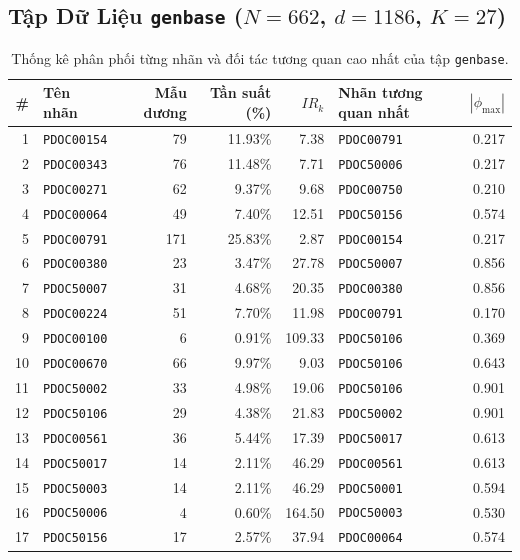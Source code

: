 \documentclass[11pt,a4paper]{article}
\begin{document}
\subsection{Tập Dữ Liệu \texttt{genbase} ($N=662$, $d=1186$, $K=27$)}
\begin{table}[htbp]
\centering
\footnotesize
\caption{Thống kê phân phối từng nhãn và đối tác tương quan cao nhất của tập \texttt{genbase}.}
\begin{tabularx}{0.95\textwidth}{r l r r r l r}
\toprule
\textbf{\#} & \textbf{Tên nhãn} & \textbf{Mẫu dương} & \textbf{Tần suất (\%)} & \textbf{$IR_k$} & \textbf{Nhãn tương quan nhất} & \textbf{$|\phi_{\max}|$} \\
\midrule
1 & \texttt{PDOC00154} & 79 & 11.93\% & 7.38 & \texttt{PDOC00791} & 0.217 \\
2 & \texttt{PDOC00343} & 76 & 11.48\% & 7.71 & \texttt{PDOC50006} & 0.217 \\
3 & \texttt{PDOC00271} & 62 & 9.37\% & 9.68 & \texttt{PDOC00750} & 0.210 \\
4 & \texttt{PDOC00064} & 49 & 7.40\% & 12.51 & \texttt{PDOC50156} & 0.574 \\
5 & \texttt{PDOC00791} & 171 & 25.83\% & 2.87 & \texttt{PDOC00154} & 0.217 \\
6 & \texttt{PDOC00380} & 23 & 3.47\% & 27.78 & \texttt{PDOC50007} & 0.856 \\
7 & \texttt{PDOC50007} & 31 & 4.68\% & 20.35 & \texttt{PDOC00380} & 0.856 \\
8 & \texttt{PDOC00224} & 51 & 7.70\% & 11.98 & \texttt{PDOC00791} & 0.170 \\
9 & \texttt{PDOC00100} & 6 & 0.91\% & 109.33 & \texttt{PDOC50106} & 0.369 \\
10 & \texttt{PDOC00670} & 66 & 9.97\% & 9.03 & \texttt{PDOC50106} & 0.643 \\
11 & \texttt{PDOC50002} & 33 & 4.98\% & 19.06 & \texttt{PDOC50106} & 0.901 \\
12 & \texttt{PDOC50106} & 29 & 4.38\% & 21.83 & \texttt{PDOC50002} & 0.901 \\
13 & \texttt{PDOC00561} & 36 & 5.44\% & 17.39 & \texttt{PDOC50017} & 0.613 \\
14 & \texttt{PDOC50017} & 14 & 2.11\% & 46.29 & \texttt{PDOC00561} & 0.613 \\
15 & \texttt{PDOC50003} & 14 & 2.11\% & 46.29 & \texttt{PDOC50001} & 0.594 \\
16 & \texttt{PDOC50006} & 4 & 0.60\% & 164.50 & \texttt{PDOC50003} & 0.530 \\
17 & \texttt{PDOC50156} & 17 & 2.57\% & 37.94 & \texttt{PDOC00064} & 0.574 \\

\end{tabularx}
\end{table}
\end{document}
